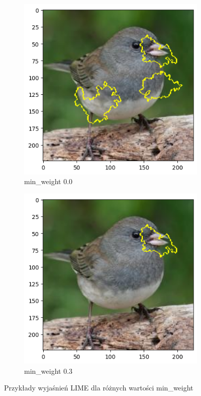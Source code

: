 \begin{figure}
	\centering
	\begin{subfigure}[b]{0.3\textwidth}
		\includegraphics[width=.9\textwidth]{img/parameters/lime/min_weight_00}
		\caption{min\_weight 0.0}  \label{rys:parameters_lime_numsamples_5}
	\end{subfigure}
	\begin{subfigure}[b]{0.3\textwidth}
		\centering\includegraphics[width=.9\textwidth]{img/parameters/lime/min_weight_03}
		\caption{min\_weight 0.3}  \label{rys:parameters_lime_numsamples_1000}
	\end{subfigure}
	\caption{Przykłady wyjaśnień LIME dla różnych wartości min\_weight}
\end{figure}


